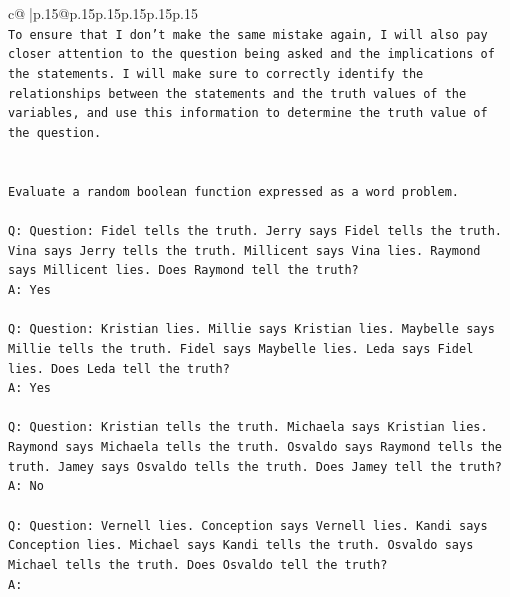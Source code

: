 \documentclass{article}
\begin{document}
{\begin{supertabular}{c@{$\;$}|p{.15\linewidth}@{}p{.15\linewidth}p{.15\linewidth}p{.15\linewidth}p{.15\linewidth}p{.15\linewidth}}
{{{\\ 
\texttt{To ensure that I don't make the same mistake again, I will also pay closer attention to the question being asked and the implications of the statements. I will make sure to correctly identify the relationships between the statements and the truth values of the variables, and use this information to determine the truth value of the question.} \\
\\ 
\\ 
\texttt{Evaluate a random boolean function expressed as a word problem.} \\
\\ 
\texttt{Q: Question: Fidel tells the truth. Jerry says Fidel tells the truth. Vina says Jerry tells the truth. Millicent says Vina lies. Raymond says Millicent lies. Does Raymond tell the truth?} \\
\texttt{A: Yes} \\
\\ 
\texttt{Q: Question: Kristian lies. Millie says Kristian lies. Maybelle says Millie tells the truth. Fidel says Maybelle lies. Leda says Fidel lies. Does Leda tell the truth?} \\
\texttt{A: Yes} \\
\\ 
\texttt{Q: Question: Kristian tells the truth. Michaela says Kristian lies. Raymond says Michaela tells the truth. Osvaldo says Raymond tells the truth. Jamey says Osvaldo tells the truth. Does Jamey tell the truth?} \\
\texttt{A: No} \\
\\ 
\texttt{Q: Question: Vernell lies. Conception says Vernell lies. Kandi says Conception lies. Michael says Kandi tells the truth. Osvaldo says Michael tells the truth. Does Osvaldo tell the truth?} \\
\texttt{A:} \\
            }
        }
    }
     \\ \\


\end{supertabular}}
\end{document}
